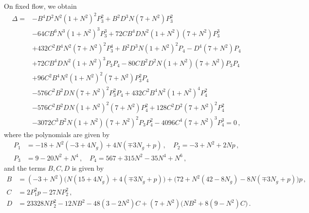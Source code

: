 On fixed flow, we obtain
\begin{align} \Delta=&- B^4 D^2 N^2 (1 + N^2)^2 P_3^2 + B^2 D^3 N (7 + N^2) P_3^2 \nonumber\\ & - 64 C B^6 N^3 (1 + N^2)^3 P_3^3 + 72 C B^4 D N^2 (1 + N^2) (7 + N^2) P_3^3 \nonumber\\&+ 432 C^2 B^4 N^2 (7 + N^2)^2 P_3^4  + B^2 D^3 N (1 + N^2)^2 P_4  - D^4 (7 + N^2) P_4 \nonumber\\&+ 72 C B^4 D N^2 (1 + N^2)^3 P_3 P_4 - 80 C B^2 D^2 N (1 + N^2) (7 + N^2) P_3 P_4 \nonumber\\&+ 96 C^2 B^4 N^2 (1 + N^2)^2 (7 + N^2) P_3^2 P_4 \label{eq:Delta0}\\ & - 576 C^2 B^2 D N (7 + N^2)^2 P_3^2 P_4 + 432 C^2 B^4 N^2 (1 + N^2)^4 P_4^2\nonumber\\& - 576 C^2 B^2 D N (1 + N^2)^2 (7 + N^2) P_4^2  + 128 C^2 D^2 (7 + N^2)^2 P_4^2  \nonumber\\&- 3072 C^3 B^2 N (1 + N^2) (7 + N^2)^2 P_3 P_4^2 - 4096 C^4 (7 + N^2)^3 P_4^3  = 0 \,,\nonumber
\end{align}
where the polynomials are given by
\begin{align} 
    P_1 &= -18 + N^2 (-3 + 4 N_g) + 4 N (\mp3 N_g + p) \,,\quad P_2 = -3 + N^2 + 2 N p \,,\\ P_3 &= 9 - 20 N^2 + N^4 \,,\quad  P_4 = 567 + 315 N^2 - 35 N^4 + N^6 \,, 
\end{align}
and the terms $B, C,D$ is given by
\begin{align}
    B &= (-3 + N^2) \big(N (15 + 4 N_g) + 4 (\mp3 N_g + p)\big) + \big(72 + N^2 (42 - 8 N_g) - 8 N (\mp3 N_g + p)\big) p\,, \\ C &= 2 P_1^2 p - 27 N P_2^2 \,,\\ D &= 23328 N P_2^2 - 12 N B^2 - 48 (3 - 2 N^2) C + (7 + N^2) \big(N B^2 + 8 (9 - N^2) C\big)\,.
\end{align}


